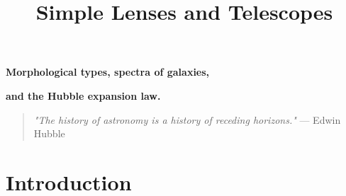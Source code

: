 \documentclass[12pt]{article}
\title{Simple Lenses and Telescopes}
\begin{document}
\vspace*{-.8in}
\vspace{.5in}

\centerline{\large\bf Morphological types, spectra of galaxies,}
\centerline{\large\bf  and the Hubble expansion law.}
\vspace{.3in}

\begin{quote}
{\it "The history of astronomy is a history of receding horizons."}  --- Edwin Hubble
\end{quote}

\section{Introduction}
\pagestyle{myheadings}
\thispagestyle{plain}
\end{document}
